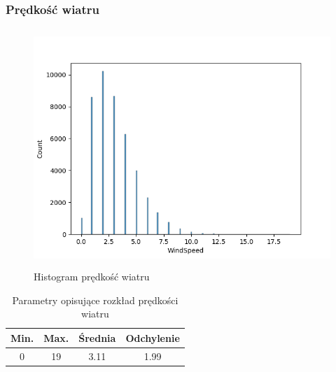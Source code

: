\documentclass[18pt, letterpaper]{article}
\begin{document}
\subsubsection{Prędkość wiatru}
\begin{figure}[H]
\centering
\includegraphics[width=120mm, height=90mm]{visualisations/histograms/WindSpeed_hist.png}
\caption{Histogram prędkość wiatru}
\end{figure}
\begin{table}[H]
\centering
\begin{tabular}{|c|c|c|c|}
\hline
Min.  & Max. & Średnia & Odchylenie \\ \hline
0 & 19 & 3.11   & 1.99      \\ \hline
\end{tabular}
\caption{Parametry opisujące rozkład prędkości wiatru}
\end{table}
\end{document}
